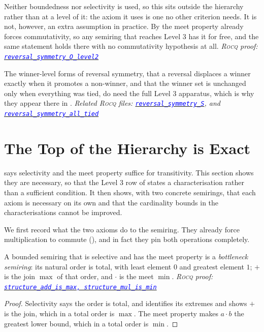 \documentclass[a4paper,UKenglish,cleveref,autoref,thm-restate,anonymous]{lipics-v2021}
\newcommand{\rocq}{\textsc{Rocq}}
\newcommand{\anonrepo}{https://anonymous.4open.science/r/Semiring_graph_algorithm-000E}
\newcommand{\rocqfile}[2]{\href{\anonrepo/#1}{\textcolor{blue}{\texttt{#2}}}}
\newcommand{\proofat}[2]{{\footnotesize\itshape\rocq{} proof: \rocqfile{#1}{#2}}}
\newcommand{\rocqrelated}[1]{{\footnotesize\itshape Related \rocq{} files: #1}}
\begin{document}
Neither boundedness nor selectivity is used, so this sits outside the
hierarchy rather than at a level of it: the axiom it uses is one no other
criterion needs. It is not, however, an extra assumption in practice. By
 the meet property already forces commutativity, so any
semiring that reaches Level 3 has it for free, and the same statement
holds there with no commutativity hypothesis at all.
\proofat{algorithm/ReversalsymmetryN.v}{reversal\_symmetry\_O\_level2}

The winner-level forms of reversal symmetry, that a reversal displaces a
winner exactly when it promotes a non-winner, and that the winner set is
unchanged only when everything was tied, do need the full Level 3
apparatus, which is why they appear there in .
\rocqrelated{\rocqfile{algorithm/ReversalsymmetryN.v}{reversal\_symmetry\_S}, and
\rocqfile{algorithm/ReversalsymmetryN.v}{reversal\_\allowbreak symmetry\_all\_tied}}

\section{The Top of the Hierarchy is Exact}\label{sec:characterisation}

 says selectivity and the meet property suffice for
transitivity. This section shows they are necessary, so that the Level 3
row of  states a characterisation rather than a
sufficient condition. It then shows, with two concrete semirings, that
each axiom is necessary on its own and that the cardinality bounds in the
characterisations cannot be improved.

We first record what the two axioms do to the semiring. They already force
multiplication to commute (), and in fact they pin both
operations completely.

\begin{proposition}[Structure]\label{thm:structure}
A bounded semiring that is selective and has the meet property is a
\emph{bottleneck semiring}: its natural order is total, with least element
$0$ and greatest element $1$; $+$ is the join $\max$ of that order, and
$\cdot$ is the meet $\min$.
\proofat{algorithm/SchulzeOrderN.v}{structure\_add\_is\_max,
structure\_mul\_is\_min}
\end{proposition}

\begin{proof}
Selectivity says the order is total, and 
identifies its extremes and shows $+$ is the join, which in a total order is
$\max$. The meet property makes $a\cdot b$ the greatest lower bound, which
in a total order is $\min$. 
\end{proof}
\end{document}
